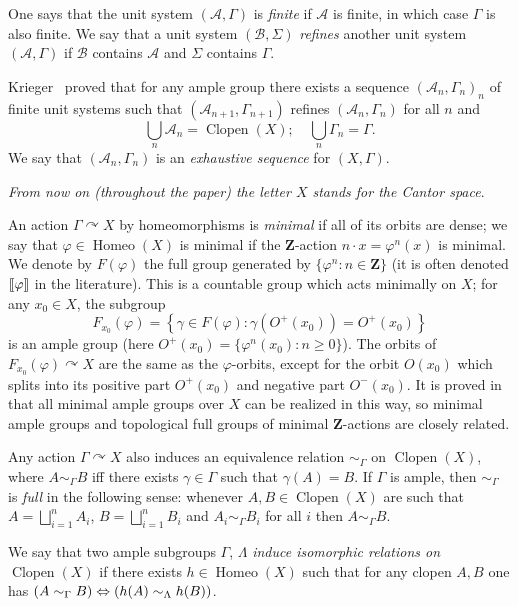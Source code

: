 \documentclass[AHL,Unicode]{cedram}
\DeclareMathOperator{\Homeo}{Homeo}
\DeclareMathOperator{\Clopen}{Clopen}
\newcommand{\actson}{\curvearrowright}
\newcommand{\Z}{\mathbf{Z}}
\newcommand{\mcA}{\mathcal{A}}
\newcommand{\mcB}{\mathcal{B}}
\newcommand{\llbracket}{\mathopen{[\mkern -2.7mu[}}
\newcommand{\rrbracket}{\mathclose{]\mkern -2.7mu]}}
\let\oldLeftrightarrow\Leftrightarrow
\renewcommand*{\Leftrightarrow}{\mathchoice{\Longleftrightarrow}{\oldLeftrightarrow}{\oldLeftrightarrow}{\oldLeftrightarrow}}
\begin{document}
One says that the unit system $(\mcA,\Gamma)$ is \emph{finite} if $\mcA$ is finite, in which case $\Gamma$ is also finite. We say that a unit system $(\mcB,\Sigma)$ \emph{refines} another unit system $(\mcA,\Gamma)$ if $\mcB$ contains $\mcA$ and $\Sigma$ contains $\Gamma$.

Krieger~\cite[Lemma~2.1]{Krieger1979} proved that for any ample group there exists a sequence $(\mcA_n,\Gamma_n)_n$ of finite unit systems such that $(\mcA_{n+1},\Gamma_{n+1})$ refines $(\mcA_n,\Gamma_n)$ for all $n$ and
\[
\bigcup_n \mcA_n=\Clopen(X); \quad \bigcup_n \Gamma_n=\Gamma.
\]
We say that $(\mcA_n,\Gamma_n)$ is an \emph{exhaustive sequence} for $(X,\Gamma)$.

\emph{From now on (throughout the paper) the letter $X$ stands for the Cantor space}.

An action $\Gamma \actson X$ by homeomorphisms is \emph{minimal} if all of its orbits are dense; we say that $\varphi \in \Homeo(X)$ is minimal if the $\Z$-action $n \cdot x=\varphi^n(x)$ is minimal. We denote by $F(\varphi)$ the full group generated by $\{\varphi^n : n \in \Z\}$ (it is often denoted $\llbracket \varphi \rrbracket$ in the literature). This is a countable group which acts minimally on $X$; for any $x_0 \in X$, the subgroup
\[
F_{x_0}(\varphi)= \left\{ \gamma \in F(\varphi) : \gamma(O^+(x_0))=O^+(x_0)\right\}
\]
is an ample group (here $O^+(x_0)=\{ \varphi^n(x_0) : n \ge 0\}$). The orbits of $F_{x_0}(\varphi) \actson X$ are the same as the $\varphi$-orbits, except for the orbit $O(x_0)$ which splits into its positive part $O^+(x_0)$ and negative part $O^-(x_0)$. It is proved in~\cite{Melleray2023} that all minimal ample groups over $X$ can be realized in this way, so minimal ample groups and topological full groups of minimal $\Z$-actions are closely related.

Any action $\Gamma \actson X$ also induces an equivalence relation $\sim_\Gamma$ on $\Clopen(X)$, where $A \sim_\Gamma B$ iff there exists $\gamma \in \Gamma$ such that $\gamma(A)=B$. If $\Gamma$ is ample, then $\sim_\Gamma$ is \emph{full} in the following sense: whenever $A, B \in \Clopen(X)$ are such that $A= \bigsqcup_{i=1}^n A_i$, $B=\bigsqcup_{i=1}^n B_i$ and $A_i \sim_\Gamma B_i$ for all $i$ then $A \sim_\Gamma B$.


\begin{defi}
We say that two ample subgroups $\Gamma$, $\Lambda$ \emph{induce isomorphic relations on $\Clopen(X)$} if there exists $h \in \Homeo(X)$ such that for any clopen $A,B$ one has $(A \sim_\Gamma B) \Leftrightarrow (h(A) \sim_\Lambda h(B))$.
\end{defi}
\end{document}
